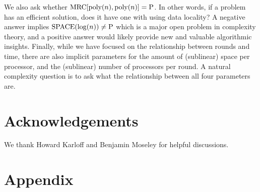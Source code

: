 \documentclass[11pt]{article}
\theoremstyle{definition}
\theoremstyle{remark}
\newcommand{\mrc}{\textup{MRC}}
\newcommand{\TIME}{\textup{TIME}}
\newcommand{\TISP}{\textup{TISP}}
\renewcommand{\P}{\textup{P}}
\renewcommand{\L}{\textup{SPACE}(\log(n))}
\begin{document}


We also ask whether $\mrc[\text{poly}(n), \text{poly}(n)] = \P$. In other
words, if a problem has an efficient solution, does it have one with using data
locality? A negative answer implies $\L\neq\P$ which is a major open problem in
complexity theory, and a positive answer would likely provide new and valuable
algorithmic insights. Finally, while we have focused on the relationship
between rounds and time, there are also implicit parameters for the amount of
(sublinear) space per processor, and the (sublinear) number of processors per
round. A natural complexity question is to ask what the relationship
between all four parameters are.

\section*{Acknowledgements} We thank Howard Karloff and Benjamin Moseley for
helpful discussions.





\section*{Appendix}
\end{document}
